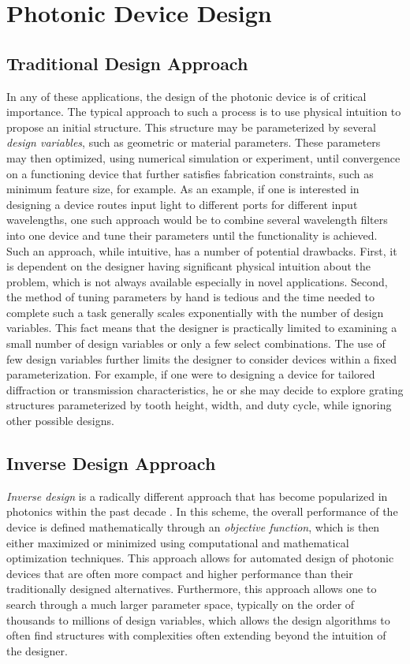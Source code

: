 \section{Photonic Device Design}

\subsection{Traditional Design Approach}

In any of these applications, the design of the photonic device is of critical importance.
The typical approach to such a process is to use physical intuition to propose an initial structure.
This structure may be parameterized by several \textit{design variables}, such as geometric or material parameters.
These parameters may then optimized, using numerical simulation or experiment, until convergence on a functioning device that further satisfies fabrication constraints, such as minimum feature size, for example.
As an example, if one is interested in designing a device routes input light to different ports for different input wavelengths, one such approach would be to combine several wavelength filters into one device and tune their parameters until the functionality is achieved.
Such an approach, while intuitive, has a number of potential drawbacks.
First, it is dependent on the designer having significant physical intuition about the problem, which is not always available especially in novel applications.
Second, the method of tuning parameters by hand is tedious and the time needed to complete such a task generally scales exponentially with the number of design variables.
This fact means that the designer is practically limited to examining a small number of design variables or only a few select combinations.
The use of few design variables further limits the designer to consider devices within a fixed parameterization.
For example, if one were to designing a device for tailored diffraction or transmission characteristics, he or she may decide to explore grating structures parameterized by tooth height, width, and duty cycle, while ignoring other possible designs.

\subsection{Inverse Design Approach}

\textit{Inverse design} is a radically different approach that has become popularized in photonics within the past decade \cite{molesky_inverse_2018}.  
In this scheme, the overall performance of the device is defined mathematically through an \textit{objective function}, which is then either maximized or minimized using computational and mathematical optimization techniques.
This approach allows for automated design of photonic devices that are often more compact and higher performance than their traditionally designed alternatives.
Furthermore, this approach allows one to search through a much larger parameter space, typically on the order of thousands to millions of design variables, which allows the design algorithms to often find structures with complexities often extending beyond the intuition of the designer.

